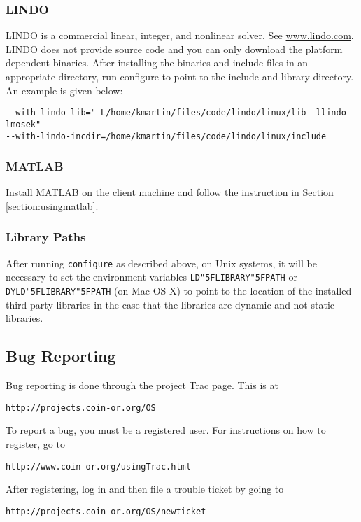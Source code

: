 \documentclass[11pt]{article}
\renewcommand{\_}{{\char"5F}}
\renewcommand{\{}{{\char"7B}}
\renewcommand{\}}{{\char"7D}}
\renewcommand{\^}{{\char"0D}}
\renewcommand{\'}{{\char"0D}}
\begin{document}
\subsubsection{LINDO}

LINDO is a commercial linear, integer, and nonlinear solver. See \url{www.lindo.com}.  LINDO does not provide source code and you can only download the platform dependent binaries. After installing the binaries and include files in an appropriate directory, run configure to point to the include and library directory. An example is given below:

\begin{verbatim}
--with-lindo-lib="-L/home/kmartin/files/code/lindo/linux/lib -llindo -lmosek"
--with-lindo-incdir=/home/kmartin/files/code/lindo/linux/include
\end{verbatim}


\subsubsection{MATLAB}

Install MATLAB on the client machine and follow the instruction in Section
 \ref{section:usingmatlab}.

\subsubsection{Library Paths}

After running {\tt configure} as described above,  on Unix systems, it will be necessary to set the environment variables {\tt LD\_LIBRARY\_PATH} or {\tt DYLD\_LIBRARY\_PATH} (on Mac OS X) to point to the location of the installed third party libraries in the case that the libraries are dynamic and not static libraries.


\subsection{Bug Reporting}

Bug reporting is done through the project Trac page. This is at
\begin{verbatim}
http://projects.coin-or.org/OS
\end{verbatim}
To report a bug, you must be a registered user.  For  instructions on  how to register, go to
\begin{verbatim}
http://www.coin-or.org/usingTrac.html
\end{verbatim}
After registering, log in and then file a trouble ticket by going to
\begin{verbatim}
http://projects.coin-or.org/OS/newticket
\end{verbatim}
\end{document}
